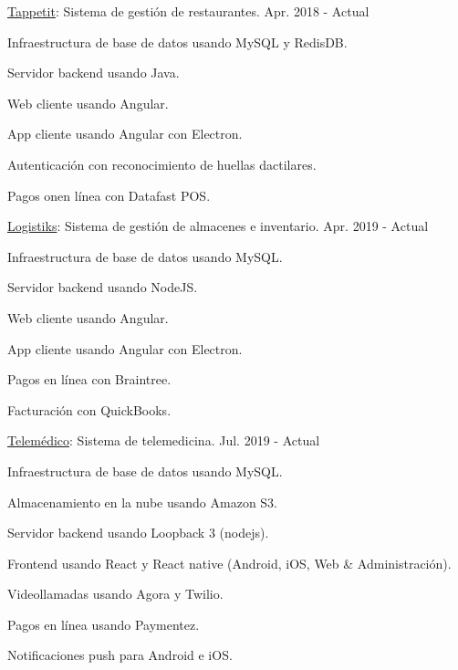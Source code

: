 \begin{cventries}
  \cventry
    {\href{https://tappetit.com}{Tappetit}: Sistema de gestión de restaurantes.} %
    {} %
    {} %
    {Apr. 2018 - Actual} %
    {
      \begin{cvitems} %
        \item {Infraestructura de base de datos usando MySQL y RedisDB.}
        \item {Servidor backend usando Java.}
        \item {Web cliente usando Angular.}
        \item {App cliente usando Angular con Electron.}
        \item {Autenticación con reconocimiento de huellas dactilares.}
        \item {Pagos onen línea con Datafast POS.}
      \end{cvitems}
    }

  \cventry
    {\href{https://logistiksusa.com/}{Logistiks}: Sistema de gestión de almacenes e inventario.} %
    {} %
    {} %
    {Apr. 2019 - Actual} %
    {
      \begin{cvitems} %
        \item {Infraestructura de base de datos usando MySQL.}
        \item {Servidor backend usando NodeJS.}
        \item {Web cliente usando Angular.}
        \item {App cliente usando Angular con Electron.}
        \item {Pagos en línea con Braintree.}
        \item {Facturación con QuickBooks.}
      \end{cvitems}
    }

  \cventry
    {\href{https://telemedico.com.ec/}{Telemédico}: Sistema de telemedicina.} %
    {} %
    {} %
    {Jul. 2019 - Actual} %
    {
      \begin{cvitems} %
        \item {Infraestructura de base de datos usando MySQL.}
        \item {Almacenamiento en la nube usando Amazon S3.}
        \item {Servidor backend usando Loopback 3 (nodejs).}
        \item {Frontend usando React y React native (Android, iOS, Web \& Administración).}
        \item {Videollamadas usando Agora y Twilio.}
        \item {Pagos en línea usando Paymentez.}
        \item {Notificaciones push para Android e iOS.}
      \end{cvitems}
    }


\end{cventries}
